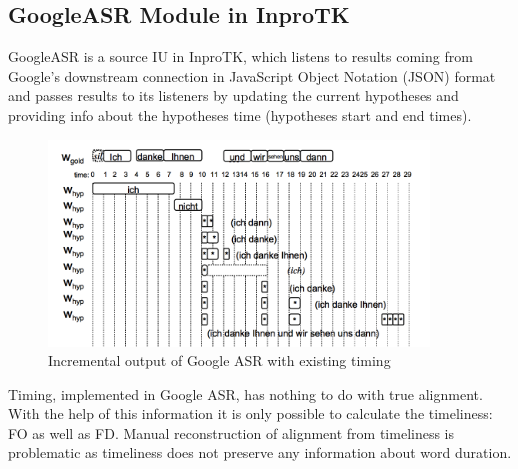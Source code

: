 \subsection {GoogleASR Module in InproTK}
GoogleASR is a source IU in InproTK, which listens to results coming from
Google's  downstream connection in JavaScript Object Notation (JSON) format and
passes results to its listeners by updating the current hypotheses and providing
info about the hypotheses time (hypotheses start and end times).
 \begin{figure}[htbp]
  \centering
   \includegraphics[width=0.9\textwidth]{images/google_output.png}
  \caption{Incremental output of Google ASR with existing timing}
  \label{fig:google_ouput}
\end{figure}

Timing, implemented in Google ASR, has nothing to do with true alignment.
With the help of this information  it is only possible to calculate the
timeliness: FO as well as FD.  Manual reconstruction of alignment from
timeliness is problematic as timeliness does not preserve any information about word
duration. 


